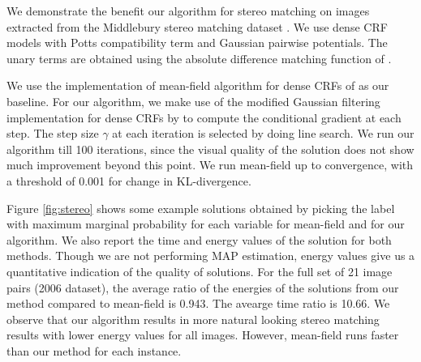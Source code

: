 \label{subsec:stereo}
 We demonstrate the benefit our algorithm for stereo matching on images extracted from the Middlebury stereo matching dataset \citep{scharstein2001taxonomy}. We use dense CRF models with Potts compatibility term and Gaussian pairwise potentials. The unary terms are obtained using the absolute difference matching function of \citep{scharstein2001taxonomy}. 

 We use the implementation of mean-field algorithm for
dense CRFs of \citep{koltun2011efficient} as our baseline. For our algorithm,
we make use of the modified Gaussian filtering implementation for dense CRFs by
\citep{ajanthan2017efficient} to compute the conditional gradient at each step.
The step size $\gamma$ at each iteration is selected by doing line search. We
run our algorithm till 100 iterations, since the visual quality of the solution
does not show much improvement beyond this point. We run mean-field up to
convergence, with a threshold of 0.001 for change in KL-divergence. 

 Figure \ref{fig:stereo} shows some example solutions obtained by picking the
label with maximum marginal probability for each variable for mean-field and
for our algorithm. We also report the time and energy values of the solution
for both methods. Though we are not performing MAP estimation, energy values
give us a quantitative indication of the quality of solutions. For the full set of
21 image pairs (2006 dataset), the average ratio of the energies of the solutions from our method 
compared to mean-field is 0.943. The avearge time ratio is 10.66. We observe that our algorithm results in more natural looking stereo matching results with lower energy values for all images. However, mean-field runs faster than our method for each instance.


